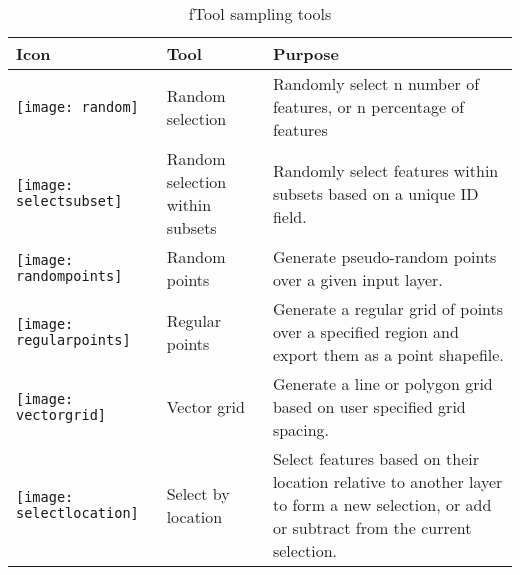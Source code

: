 \begin{table}[ht]
\centering
\caption{fTool sampling tools}\label{tab:ftool_sampling}\medskip
 \begin{tabular}{|p{0.3in}|p{1.3in}|p{4.6in}|}
 \hline \textbf{Icon} & \textbf{Tool} & \textbf{Purpose} \\
 \hline \texttt{[image: random]} & Random selection & Randomly 
select n number of features, or n percentage of features \\
 \hline \texttt{[image: selectsubset]} & Random selection within 
subsets & Randomly select features within subsets based on a unique ID field. \\
 \hline \texttt{[image: randompoints]} & Random points & Generate 
pseudo-random points over a given input layer. \\
 \hline \texttt{[image: regularpoints]} & Regular points & Generate 
a regular grid of points over a specified region and export them as a point shapefile. \\
 \hline \texttt{[image: vectorgrid]} & Vector grid & Generate a 
line or polygon grid based on user specified grid spacing. \\
 \hline \texttt{[image: selectlocation]} & Select by location & 
Select features based on their location relative to another layer to form a 
new selection, or add or subtract from the current selection. \\
 \hline
\end{tabular}
\end{table}


